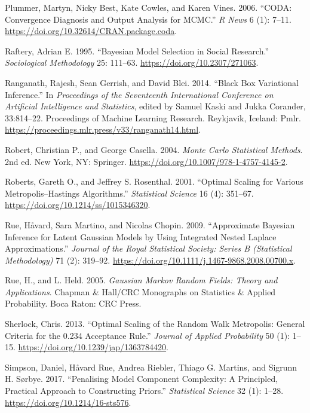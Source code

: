 \documentclass[
  11pt,
  letterpaper,
]{scrbook}
\newlength{\cslhangindent}
\newenvironment{CSLReferences}[2] %
 {\begin{list}{}{%
  \setlength{\itemindent}{0pt}
  \setlength{\leftmargin}{0pt}
  \setlength{\parsep}{0pt}
  \ifodd #1
   \setlength{\leftmargin}{\cslhangindent}
   \setlength{\itemindent}{-1\cslhangindent}
  \fi
  \setlength{\itemsep}{#2\baselineskip}}}
 {\end{list}}
\theoremstyle{definition}
\theoremstyle{plain}
\theoremstyle{plain}
\theoremstyle{plain}
\theoremstyle{definition}
\theoremstyle{definition}
\theoremstyle{remark}
\begin{document}
\begin{CSLReferences}{1}{0}
Plummer, Martyn, Nicky Best, Kate Cowles, and Karen Vines. 2006.
{``{CODA}: Convergence Diagnosis and Output Analysis for {MCMC}.''}
\emph{R News} 6 (1): 7--11.
\url{https://doi.org/10.32614/CRAN.package.coda}.

Raftery, Adrian E. 1995. {``Bayesian Model Selection in Social
Research.''} \emph{Sociological Methodology} 25: 111--63.
\url{https://doi.org/10.2307/271063}.

Ranganath, Rajesh, Sean Gerrish, and David Blei. 2014. {``Black Box
Variational Inference.''} In \emph{Proceedings of the Seventeenth
International Conference on Artificial Intelligence and Statistics},
edited by Samuel Kaski and Jukka Corander, 33:814--22. Proceedings of
Machine Learning Research. Reykjavik, Iceland: Pmlr.
\url{https://proceedings.mlr.press/v33/ranganath14.html}.

Robert, Christian P., and George Casella. 2004. \emph{{M}onte {C}arlo
Statistical Methods}. 2nd ed. New York, NY: Springer.
\url{https://doi.org/10.1007/978-1-4757-4145-2}.

Roberts, Gareth O., and Jeffrey S. Rosenthal. 2001. {``Optimal Scaling
for Various {M}etropolis--{H}astings Algorithms.''} \emph{Statistical
Science} 16 (4): 351--67. \url{https://doi.org/10.1214/ss/1015346320}.

Rue, Håvard, Sara Martino, and Nicolas Chopin. 2009. {``Approximate
Bayesian Inference for Latent {G}aussian Models by Using Integrated
Nested {L}aplace Approximations.''} \emph{Journal of the Royal
Statistical Society: Series B (Statistical Methodology)} 71 (2):
319--92. \url{https://doi.org/10.1111/j.1467-9868.2008.00700.x}.

Rue, H., and L. Held. 2005. \emph{{G}aussian {M}arkov Random Fields:
Theory and Applications}. Chapman \& Hall/CRC Monographs on Statistics
\& Applied Probability. Boca Raton: CRC Press.

Sherlock, Chris. 2013. {``Optimal Scaling of the Random Walk
{M}etropolis: General Criteria for the 0.234 Acceptance Rule.''}
\emph{Journal of Applied Probability} 50 (1): 1--15.
\url{https://doi.org/10.1239/jap/1363784420}.

Simpson, Daniel, Håvard Rue, Andrea Riebler, Thiago G. Martins, and
Sigrunn H. Sørbye. 2017. {``Penalising Model Component Complexity: A
Principled, Practical Approach to Constructing Priors.''}
\emph{Statistical Science} 32 (1): 1--28.
\url{https://doi.org/10.1214/16-sts576}.


\end{CSLReferences}
\end{document}
